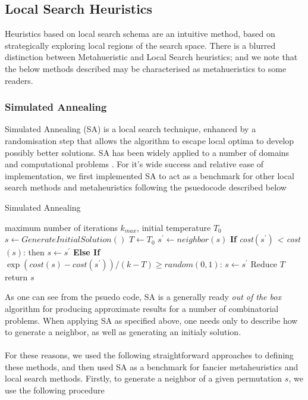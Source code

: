 \documentclass[a4paper,10pt]{article}
\begin{document}
\newpage
\subsection{Local Search Heuristics}
Heuristics based on local search schema are an intuitive method, based on strategically exploring local regions of the search space. There is a blurred distinction between Metahueristic and Local Search heuristics; and we note that the below methods described may be characterised as metahueristics to some readers. 

\subsubsection*{Simulated Annealing}
Simulated Annealing (SA) is a local search technique, enhanced by a randomisation step that allows the algorithm to escape local optima to develop possibly better solutions. SA has been widely applied to a number of domains and computational problems \cite{SAReview}. For it's wide success and relative ease of implementation, we first implemented SA to act as a benchmark for other local search methods and metaheuristics following the psuedocode described below 

\begin{algorithm}
\caption{Simulated Annealing}\label{alg:cap}
\begin{algorithmic}
\Require maximum number of iterations $k_{max}$, initial temperature $T_0$
\State $s \gets GenerateInitialSolution()$
    \State $T\gets T_0$
    \State $s^{\prime} \gets neighbor(s) $
    \State \textbf{If} \textit{cost$(s^\prime)$ < cost$(s)$}: then $s\gets s^\prime$
    \State \textbf{Else If}  $\exp(cost(s) - cost(s^\prime))/(k-T)\geq random(0,1)$: $s\gets s^\prime$
\EndFor
    \State Reduce $T$
\EndWhile
\State return $s$
\end{algorithmic}
\end{algorithm}

As one can see from the psuedo code, SA is a generally ready \textit{out of the box} algorithm for producing approximate results for a number of combinatorial problems. When applying SA as specified above, one needs only to describe how to generate a neighbor, as well as generating an initialy solution. \\
\\
For these reasons, we used the following straightforward approaches to defining these methods, and then used SA as a benchmark for fancier metaheuristics and local search methods. Firstly, to generate a neighbor of a given permutation $s$, we use the following procedure
\end{document}
